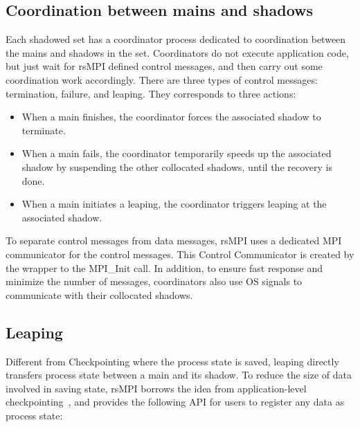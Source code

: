 \subsection{Coordination between mains and shadows}
Each shadowed set has a coordinator process dedicated to coordination between the mains and shadows in the set. 
Coordinators do not execute application code, but just wait for rsMPI defined control messages, and then carry out some 
coordination work accordingly. There are three types of control messages: termination, failure, and leaping. They corresponds to three actions:
\begin{itemize}
  \item When a main finishes, the coordinator forces the associated shadow to terminate.
  \item When a main fails, the coordinator temporarily speeds up the associated shadow by suspending the other collocated shadows, until the recovery is done.
  \item When a main initiates a leaping, the coordinator triggers leaping at the associated shadow.
\end{itemize}
To separate control messages from data messages, rsMPI uses a dedicated MPI communicator for the control messages. This Control Communicator is created by the wrapper to the MPI\_Init call. In addition, to ensure fast response and minimize the number of messages, coordinators also use OS signals to communicate with their collocated shadows. %


\subsection{Leaping}
Different from Checkpointing where the process state is saved, leaping directly transfers process state between a main and its shadow. 
To reduce the size of data involved in saving state, rsMPI borrows the idea from application-level checkpointing~\cite{Beguelin97applicationlevel}, and provides the following API for users to register any data as process state:

